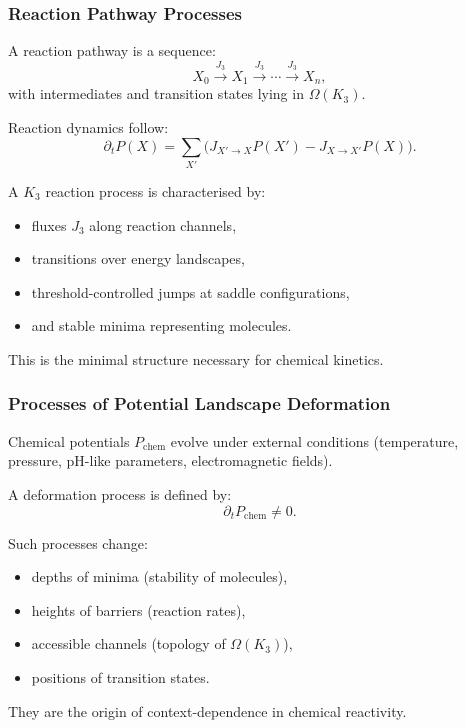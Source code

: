 \subsubsection{Reaction Pathway Processes}

A reaction pathway is a sequence:
\[
X_0 \xrightarrow{J_3} X_1 \xrightarrow{J_3} \cdots 
\xrightarrow{J_3} X_n,
\]
with intermediates and transition states lying in $\Omega(K_3)$.

Reaction dynamics follow:
\[
\partial_t P(X) = 
\sum_{X'} \Big(
    J_{X'\to X} P(X') 
    - J_{X\to X'} P(X)
\Big).
\]

A $K_3$ reaction process is characterised by:
\begin{itemize}
    \item fluxes $J_3$ along reaction channels,
    \item transitions over energy landscapes,
    \item threshold-controlled jumps at saddle configurations,
    \item and stable minima representing molecules.
\end{itemize}

This is the minimal structure necessary for chemical kinetics.

\subsubsection{Processes of Potential Landscape Deformation}

Chemical potentials $P_\text{chem}$ evolve under external conditions 
(temperature, pressure, pH-like parameters, electromagnetic fields).

A deformation process is defined by:
\[
\partial_t P_\text{chem} \neq 0.
\]

Such processes change:
\begin{itemize}
    \item depths of minima (stability of molecules),
    \item heights of barriers (reaction rates),
    \item accessible channels (topology of $\Omega(K_3)$),
    \item positions of transition states.
\end{itemize}

They are the origin of context-dependence in chemical reactivity.

